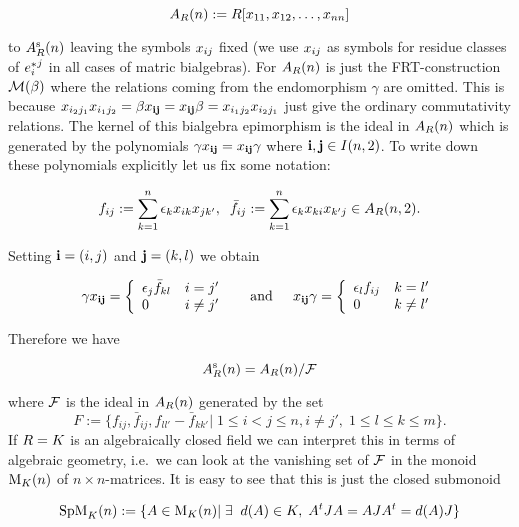 \documentclass[twoside,12pt]{article}
\begin{document}
\[ \An{\gr}:=\gr [\xes 11, \xes 12, \ldots , \xes nn] \]

to $\sAn{\gr}$ leaving the symbols $\xes ij$ fixed (we use $\xes ij$
as symbols for residue classes of $\des ij$ in all cases of matric bialgebras).
For $\An{\gr}$ is just the 
FRT-construction $\frt{\beta}$ where the relations coming from the
endomorphism $\gamma$ are omitted. This is because 
$\xes{i_2}{j_1}\xes{i_1}{j_2}=\beta \xes{\ibf i}{\ibf j}=\xes{\ibf
  i}{\ibf j}\beta=\xes{i_1}{j_2}\xes{i_2}{j_1}$ just give the ordinary
commutativity relations. The kernel of this bialgebra epimorphism is the ideal
in $\An{\gr}$ which is generated by the polynomials 
$\gamma \xes{\ibf i}{\ibf j}=\xes{\ibf
  i}{\ibf j}\gamma$ where $\ibf i,\ibf j \in \nmind 2$. To write down
these polynomials explicitly let us fix some notation:

\[f_{ij}:=\sum_{k=1}^n \epsilon_k\xes ik\xes j{k'},\;\;
\bar f_{ij}:=\sum_{k=1}^n \epsilon_k\xes ki\xes{k'} j \in \rAn{\gr}{2}.\]

Setting $\ibf i=(i,j)$ and $\ibf j=(k,l)$ we obtain

\[ \gamma  \xes{\ibf i}{\ibf j} = \left\{\begin{array}{ll}
\epsilon_j\bar f_{kl} & i=j' \\
0 & i \neq j' 
\end{array} \right .
\;\;\;\;\mbox{ and } \;\;\;\;
\xes{\ibf i}{\ibf j}\gamma = \left\{\begin{array}{ll}
\epsilon_l f_{ij} & k=l' \\
0 & k \neq l' 
\end{array} \right .
\]

Therefore we have 

\begin{equation}\label{sAn epi}\sAn{\gr}=\An{\gr}/{\cal F}\end{equation} 

where 
${\cal F}$ is the ideal in $\An{\gr}$ generated by the set
\begin{equation}\label{ideal generator} 
F:=\{ f_{ij},\bar f_{ij}, f_{ll'}-\bar f_{kk'}|\; 1 \leq i <j\leq n,
i\neq j', \; 1 \leq l\leq k \leq m\}.
\end{equation}
If $\gr=K$ is an algebraically
closed field we can interpret this in terms of algebraic geometry,
i.e.\ we can look at the vanishing set of ${\cal F}$ in the 
monoid $\gmhg nK$ of $n\times n$-matrices. 
It is easy to see that this is just the closed submonoid 

\[ \gspm nK:= \{ A \in \gmhg nK|\;\exists \;\; d(A)\in K,\;
A^t\spT A=A\spT A^t=\spq (A)\spT \}\]
\end{document}
